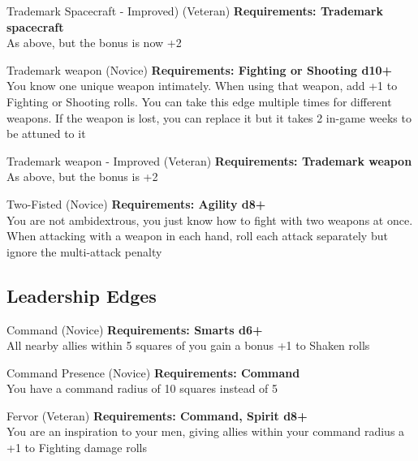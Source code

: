\begin{multicols}{2}
\begin{genericsection}{Trademark Spacecraft - Improved) (Veteran)}
\textbf{Requirements: Trademark spacecraft}\\
As above, but the bonus is now +2
\end{genericsection}

\begin{genericsection}{Trademark weapon (Novice)}
\textbf{Requirements: Fighting or Shooting d10+}\\
You know one unique weapon intimately. When using that weapon, add +1 to Fighting or Shooting rolls. You can take this edge multiple times for different weapons. If the weapon is lost, you can replace it but it takes 2 in-game weeks to be attuned to it
\end{genericsection}

\begin{genericsection}{Trademark weapon - Improved (Veteran)}
\textbf{Requirements: Trademark weapon}\\
As above, but the bonus is +2
\end{genericsection}

\begin{genericsection}{Two-Fisted (Novice)}
\textbf{Requirements: Agility d8+}\\
You are not ambidextrous, you just know how to fight with two weapons at once. When attacking with a weapon in each hand, roll each attack separately but ignore the multi-attack penalty
\end{genericsection}

%
%
\subsection{Leadership Edges}

\begin{genericsection}{Command (Novice)}
\textbf{Requirements: Smarts d6+}\\
All nearby allies within 5 squares of you gain a bonus +1 to Shaken rolls
\end{genericsection}

\begin{genericsection}{Command Presence (Novice)}
\textbf{Requirements: Command}\\
You have a command radius of 10 squares instead of 5
\end{genericsection}

\begin{genericsection}{Fervor (Veteran)}
\textbf{Requirements: Command, Spirit d8+}\\
You are an inspiration to your men, giving allies within your command radius a +1 to Fighting damage rolls
\end{genericsection}


\end{multicols}
